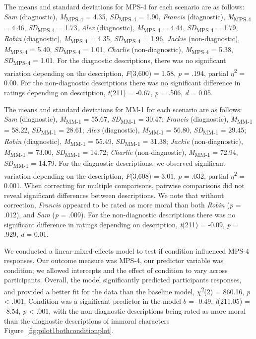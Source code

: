 \documentclass[
  english,
  man,floatsintext]{apa7}
\begin{document}
The means and standard deviations for MPS-4 for each scenario are as follows:
\emph{Sam} (diagnostic),
\emph{M}\textsubscript{MPS-4} = 4.35, \emph{SD}\textsubscript{MPS-4} = 1.90,
\emph{Francis} (diagnostic),
\emph{M}\textsubscript{MPS-4} = 4.46, \emph{SD}\textsubscript{MPS-4} = 1.73,
\emph{Alex} (diagnostic),
\emph{M}\textsubscript{MPS-4} = 4.44, \emph{SD}\textsubscript{MPS-4} = 1.79,
\emph{Robin} (diagnostic),
\emph{M}\textsubscript{MPS-4} = 4.35, \emph{SD}\textsubscript{MPS-4} = 1.96,
\emph{Jackie} (non-diagnostic),
\emph{M}\textsubscript{MPS-4} = 5.40, \emph{SD}\textsubscript{MPS-4} = 1.01,
\emph{Charlie} (non-diagnostic),
\emph{M}\textsubscript{MPS-4} = 5.38, \emph{SD}\textsubscript{MPS-4} = 1.01. For the diagnostic descriptions, there was no significant variation depending on the description, \emph{F}(3,600) = 1.58, \emph{p} = .194, partial \(\eta\)\textsuperscript{2} = 0.00. For the non-diagnostic descriptions there was no significant difference in ratings depending on description, \emph{t}(211) = -0.67, \emph{p} = .506, \emph{d} = 0.05.

The means and standard deviations for MM-1 for each scenario are as follows:
\emph{Sam} (diagnostic),
\emph{M}\textsubscript{MM-1} = 55.67, \emph{SD}\textsubscript{MM-1} = 30.47;
\emph{Francis} (diagnostic),
\emph{M}\textsubscript{MM-1} = 58.22, \emph{SD}\textsubscript{MM-1} = 28.61;
\emph{Alex} (diagnostic),
\emph{M}\textsubscript{MM-1} = 56.80, \emph{SD}\textsubscript{MM-1} = 29.45;
\emph{Robin} (diagnostic),
\emph{M}\textsubscript{MM-1} = 55.49, \emph{SD}\textsubscript{MM-1} = 31.38;
\emph{Jackie} (non-diagnostic),
\emph{M}\textsubscript{MM-1} = 73.00, \emph{SD}\textsubscript{MM-1} = 14.72;
\emph{Charlie} (non-diagnostic),
\emph{M}\textsubscript{MM-1} = 72.94, \emph{SD}\textsubscript{MM-1} = 14.79. For the diagnostic descriptions, we observed significant variation depending on the description, \emph{F}(3,608) = 3.01, \emph{p} = .032, partial \(\eta\)\textsuperscript{2} = 0.001. When correcting for multiple comparisons, pairwise comparisons did not reveal significant differences between descriptions. We note that without correction, \emph{Francis} appeared to be rated as more moral than both \emph{Robin} (\emph{p} = .012), and \emph{Sam} (\emph{p} = .009). For the non-diagnostic descriptions there was no significant difference in ratings depending on description, \emph{t}(211) = -0.09, \emph{p} = .929, \emph{d} = 0.01.

We conducted a linear-mixed-effects model to test if condition influenced MPS-4 responses. Our outcome measure was MPS-4, our predictor variable was condition; we allowed intercepts and the effect of condition to vary across participants.
Overall, the model significantly predicted participants responses, and provided a better fit for the data than the baseline model, \(\chi\)\textsuperscript{2}(2) = 860.16, \emph{p} \textless{} .001. Condition was a significant predictor in the model \(b\) = -0.49, \emph{t}(211.05) = -8.54, \emph{p} \textless{} .001, with the non-diagnostic descriptions being rated as more moral than the diagnostic descriptions of immoral characters Figure~\ref{fig:pilot1bothconditionplot}.
\end{document}
